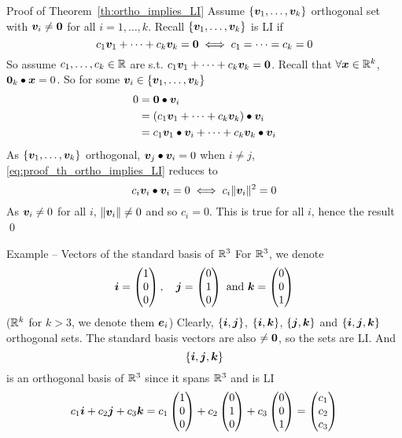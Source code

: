 \documentclass[aspectratio=169]{beamer}\usepackage[]{graphicx}\usepackage[]{xcolor}
\begin{document}
\begin{frame}{Proof of Theorem~\ref{th:ortho_implies_LI}}
Assume $\{\bm{v}_1,\ldots,\bm{v}_k\}$ orthogonal set with $\bv_i\neq\b0$ for all $i=1,\ldots,k$. Recall $\{\bm{v}_1,\ldots,\bm{v}_k\}$ is LI if 
\[
c_1\bv_1+\cdots+c_k\bv_k=\b0\iff c_1=\cdots=c_k=0
\]
So assume $c_1,\ldots,c_k\in\mathbb{R}$ are s.t. $c_1\bv_1+\cdots+c_k\bv_k=\b0$.
Recall that $\forall\bm{x}\in\mathbb{R}^k$, $\b0_k\bullet\bx=0$. So for some $\bm{v}_i\in\{\bm{v}_1,\ldots,\bm{v}_k\}$
\begin{align}
0 &= \b0\bullet\bv_i \nonumber \\
&= (c_1\bv_1+\cdots+c_k\bv_k)\bullet\bv_i \nonumber \\
&= c_1\bv_1\bullet\bv_i+\cdots+c_k\bv_k\bullet\bv_i \label{eq:proof_th_ortho_implies_LI}
\end{align}
As $\{\bm{v}_1,\ldots,\bm{v}_k\}$ orthogonal, $\bm{v}_j\bullet\bm{v}_i=0$ when $i\neq j$, \eqref{eq:proof_th_ortho_implies_LI} reduces to
\[
c_i\bm{v}_i\bullet\bm{v}_i = 0 \iff c_i\|\bm{v}_i\|^2 = 0
\]
As $\bm{v}_i\neq 0$ for all $i$, $\|\bm{v}_i\|\neq 0$ and so $c_i=0$. This is true for all $i$, hence the result \hfill\qed
\end{frame}

\begin{frame}{Example -- Vectors of the standard basis of $\mathbb{R}^3$}
For $\mathbb{R}^3$, we denote
\[
\bm{i} =\begin{pmatrix}
1\\0\\0
\end{pmatrix},\quad
\bm{j} =\begin{pmatrix}
0\\1\\0
\end{pmatrix}
\textrm{ and }
\bm{k} =\begin{pmatrix}
0\\0\\1
\end{pmatrix}
\]
($\mathbb{R}^k$ for $k>3$, we denote them $\bm{e}_i$)
\vfill
Clearly, $\{\bm{i},\bm{j}\}$, $\{\bm{i},\bm{k}\}$, $\{\bm{j},\bm{k}\}$ and $\{\bm{i},\bm{j},\bm{k}\}$ orthogonal sets. The standard basis vectors are also $\neq\b0$, so the sets are LI. And
\[
\{\bm{i},\bm{j},\bm{k}\}
\]
is an orthogonal basis of $\mathbb{R}^3$ since it spans $\mathbb{R}^3$ and is LI
\vfill
\[
c_1\bm{i}+c_2\bm{j}+c_3\bm{k}
=
c_1\begin{pmatrix}
1\\0\\0
\end{pmatrix}
+c_2\begin{pmatrix}
0\\1\\0
\end{pmatrix}
+c_3\begin{pmatrix}
0\\0\\1
\end{pmatrix}
=
\begin{pmatrix}
c_1\\c_2\\c_3
\end{pmatrix}
\]
\end{frame}
\end{document}
